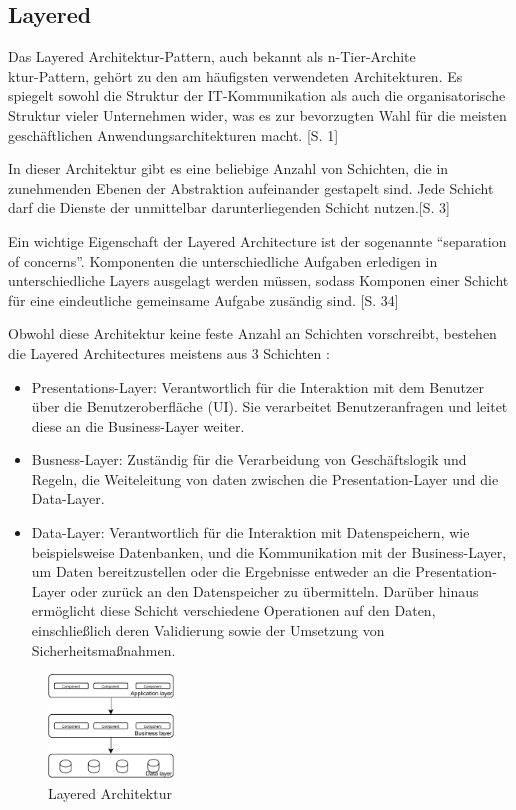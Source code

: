 \documentclass[acmtog]{acmart}
\begin{document}
\subsection{Layered}
Das Layered Architektur-Pattern, auch bekannt als n-Tier-Archite\\
ktur-Pattern, gehört zu den am häufigsten verwendeten Architekturen. Es spiegelt sowohl die Struktur 
der IT-Kommunikation als auch die organisatorische Struktur vieler Unternehmen wider,
was es zur bevorzugten Wahl für die meisten geschäftlichen Anwendungsarchitekturen macht. \cite{layered}[S. 1]

In dieser Architektur gibt es eine beliebige Anzahl von Schichten, die in zunehmenden Ebenen 
der Abstraktion aufeinander gestapelt sind. 
Jede Schicht darf die Dienste der unmittelbar darunterliegenden Schicht nutzen.\cite{layered3}[S. 3]

Ein wichtige Eigenschaft der Layered Architecture ist der sogenannte \enquote{separation of concerns}.
 Komponenten die unterschiedliche Aufgaben erledigen in unterschiedliche Layers 
ausgelagt werden müssen, sodass Komponen einer Schicht für eine eindeutliche gemeinsame Aufgabe
zusändig sind. \cite {layered2}[S. 34]

Obwohl diese Architektur keine feste Anzahl an Schichten vorschreibt, 
bestehen die Layered Architectures meistens aus 3 Schichten \cite {layered2}:
\begin{itemize}
\item Presentations-Layer: Verantwortlich für die Interaktion mit dem Benutzer über die Benutzeroberfläche (UI). 
  Sie verarbeitet Benutzeranfragen und leitet diese an die Business-Layer weiter.
\item Busness-Layer: Zuständig für die Verarbeidung von Geschäftslogik und Regeln, die Weiteleitung von daten zwischen 
  die Presentation-Layer und die Data-Layer.
\item Data-Layer: Verantwortlich für die Interaktion mit Datenspeichern, wie beispielsweise Datenbanken,
  und die Kommunikation mit der Business-Layer, um Daten bereitzustellen oder die Ergebnisse entweder an die Presentation-Layer
  oder zurück an den Datenspeicher zu übermitteln. Darüber hinaus ermöglicht diese Schicht verschiedene Operationen auf den Daten,
  einschließlich deren Validierung sowie der Umsetzung von Sicherheitsmaßnahmen.
\end{itemize}

\begin{figure}[h!]
    \centering
    \includegraphics[width=0.3\textwidth]{images/layer.pdf}
    \caption{Layered Architektur}
    \label{fig:layered}
\end{figure}
\end{document}
